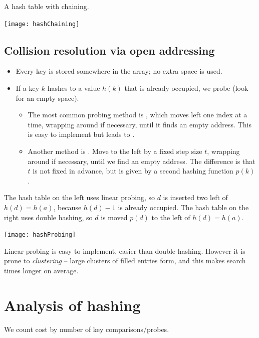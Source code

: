 \begin{Boxample}
A hash table with chaining.
\begin{center}
\texttt{[image: hashChaining]} 
\end{center}
\end{Boxample}


\subsection{Collision resolution via open addressing}
\begin{itemize}
	\item Every key is stored somewhere in the array; no extra space is used.
	\item If a key  $k$ hashes to a value $h(k)$ that is already occupied, 
	we probe (look for an empty space). 
	\begin{itemize}
		\item The most common probing method is , which moves left
		 one index at a time, wrapping around if necessary, until it finds an empty 
		 address. This is easy to implement but leads to .
		\item Another method is . Move to the left by a
		fixed step size $t$, wrapping around if necessary, until we find an
		empty address. The difference is that $t$ is not fixed in advance, but
		is given by a second hashing function $p(k)$.
	\end{itemize}
\end{itemize}

\begin{Boxample}
The hash table on the left uses linear probing, so $d$ is inserted two left of $h(d) = h(a)$, because $h(d)-1$ is already occupied.
The hash table on the right uses double hashing, so $d$ is moved $p(d)$ to the left of $h(d) = h(a)$. 
\begin{center}
\texttt{[image: hashProbing]} 
\end{center}
\end{Boxample}

Linear probing is easy to implement, easier than double hashing.
However it is prone to \emph{clustering} -- large clusters of filled entries form, 
and this makes search times longer on average.

\section{Analysis of hashing}
We count cost by number of key comparisons/probes.

